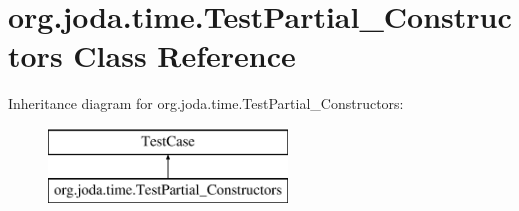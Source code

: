 \hypertarget{classorg_1_1joda_1_1time_1_1_test_partial___constructors}{\section{org.\-joda.\-time.\-Test\-Partial\-\_\-\-Constructors Class Reference}
\label{classorg_1_1joda_1_1time_1_1_test_partial___constructors}
}
Inheritance diagram for org.\-joda.\-time.\-Test\-Partial\-\_\-\-Constructors\-:\begin{figure}[H]
\begin{center}
\leavevmode
\includegraphics[height=2.000000cm]{classorg_1_1joda_1_1time_1_1_test_partial___constructors}
\end{center}
\end{figure}
